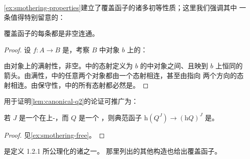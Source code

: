 \cref{ex:smothering-properties}建立了覆盖函子的诸多初等性质；这里我们强调其中%
一条值得特别留意的：

\begin{lemma}\label{lem:smothering-fibers}
覆盖函子的每条\trFiber{}都是非空连通\trGroupoid{}。
\end{lemma}

\begin{proof}
设 $f\colon A\to B$ 是\trSmothering{}，考察 $B$ 中对象 $b$ 上的\trFiber{}：
\begin{center}
\end{center}
由对象上的满射性，\trFiber{}非空。\trFiber{}中的态射定义为 $b$ 的\trFiber{}中对象之间、且映到%
$b$ 上恒同的箭头。由满性，\trFiber{}中的任意两个对象都由一个态射相连，甚至由指向%
两个方向的态射相连。由保守性，\trFiber{}中的所有态射都必然是\trInvertible{}。
\end{proof}

用于证明\cref{lem:canonical-q2}的论证可推广为：

\begin{lemma}\label{lem:smothering-free}
若 $J$ 是一个在\trReflexiveDirectedGraph{}上-\trCategory{}，而 $Q$ 是一个%
\trQuasiCategory{}，则典范函子 $\mathrm{h}(Q^J)\to(\mathrm{h}Q)^J$ 是\trSmothering{}。
\end{lemma}
\begin{proof}
见\cref{ex:smothering-free}。
\end{proof}

\trCotensor{}是定义 1.2.1 所公理化的诸\trCosmologicalLimitNotions{}之一。
那里列出的其他\trLimit{}构造也给出覆盖函子。

